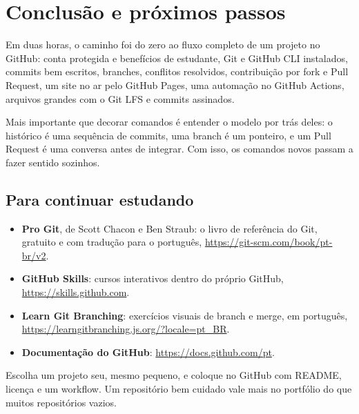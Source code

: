 \chapter{Conclusão e próximos passos}
\label{cap:conclusao}

Em duas horas, o caminho foi do zero ao fluxo completo de um projeto no
GitHub: conta protegida e benefícios de estudante, Git e GitHub CLI
instalados, commits bem escritos, branches, conflitos resolvidos,
contribuição por fork e Pull Request, um site no ar pelo GitHub Pages, uma
automação no GitHub Actions, arquivos grandes com o Git LFS e commits
assinados.

Mais importante que decorar comandos é entender o modelo por trás deles: o
histórico é uma sequência de commits, uma branch é um ponteiro, e um Pull
Request é uma conversa antes de integrar. Com isso, os comandos novos passam a
fazer sentido sozinhos.

\section{Para continuar estudando}

\begin{itemize}
  \item \textbf{Pro Git}, de Scott Chacon e Ben Straub: o livro de referência
        do Git, gratuito e com tradução para o português,
        \url{https://git-scm.com/book/pt-br/v2}.
  \item \textbf{GitHub Skills}: cursos interativos dentro do próprio GitHub,
        \url{https://skills.github.com}.
  \item \textbf{Learn Git Branching}: exercícios visuais de branch e merge, em
        português, \url{https://learngitbranching.js.org/?locale=pt_BR}.
  \item \textbf{Documentação do GitHub}: \url{https://docs.github.com/pt}.
\end{itemize}

\begin{dica}
Escolha um projeto seu, mesmo pequeno, e coloque no GitHub com README,
licença e um workflow. Um repositório bem cuidado vale mais no portfólio do
que muitos repositórios vazios.
\end{dica}
